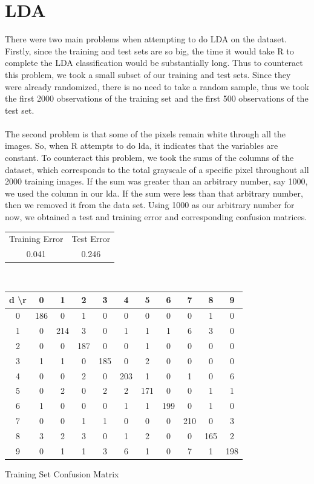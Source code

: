 \documentclass[10pt]{extarticle}
\begin{document}
\section{LDA}

There were two main problems when attempting to do LDA on the dataset. Firstly, since the training and test sets are so big, the time it would take R to complete the LDA classification would be substantially long. Thus to counteract this problem, we took a small subset of our training and test sets. Since they were already randomized, there is no need to take a random sample, thus we took the first 2000 observations of the training set and the first 500 observations of the test set.\\\\
The second problem is that some of the pixels remain white through all the images. So, when R attempts to do lda, it indicates that the variables are constant. To counteract this problem, we took the sums of the columns of the dataset, which corresponds to the total grayscale of a specific pixel throughout all 2000 training images. If the sum was greater than an arbitrary number, say 1000, we used the column in our lda. If the sum were less than that arbitrary number, then we removed it from the data set. Using 1000 as our arbitrary number for now, we obtained a test and training error and corresponding confusion matrices.
\begin{center}
	\begin{tabular}{c c}
		Training Error & Test Error\\
		0.041 & 0.246
	\end{tabular}\\
\end{center}
\begin{minipage}{.6\textwidth}
	\begin{center}
	\begin{tabular}{c | c c c c c c c c c c}
		d \textbackslash r&0&1&2&3&4&5&6&7&8&9\\ \hline
		0&186&0&1&0&0&0&0&0&1&0\\
		1&0&214&3&0&1&1&1&6&3&0\\
		2&0&0&187&0&0&1&0&0&0&0\\
		3&1&1&0&185&0&2&0&0&0&0\\
		4&0&0&2&0&203&1&0&1&0&6\\
		5&0&2&0&2&2&171&0&0&1&1\\
		6&1&0&0&0&1&1&199&0&1&0\\
		7&0&0&1&1&0&0&0&210&0&3\\
		8&3&2&3&0&1&2&0&0&165&2\\
		9&0&1&1&3&6&1&0&7&1&198
	\end{tabular}
	\bigskip 
	Training Set Confusion Matrix
	\end{center}
\end{minipage}
\end{document}
